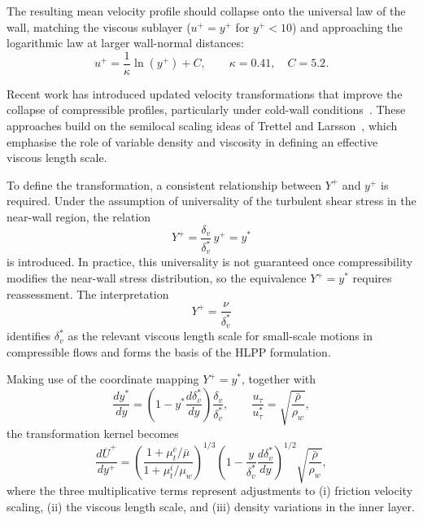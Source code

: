 The resulting mean velocity profile should collapse onto the universal law of the wall, matching the viscous sublayer ($u^{+}=y^{+}$ for $y^{+}<10$) and approaching the logarithmic law at larger wall-normal distances:
\begin{equation}
    u^{+} = \frac{1}{\kappa}\ln(y^{+}) + C, 
    \qquad \kappa = 0.41, \quad C = 5.2 .
\end{equation}

Recent work has introduced updated velocity transformations that improve the collapse of compressible profiles, particularly under cold-wall conditions~\cite{HasanEtal2023}. These approaches build on the semilocal scaling ideas of Trettel and Larsson~\cite{TrettelLarsson2016}, which emphasise the role of variable density and viscosity in defining an effective viscous length scale.

To define the transformation, a consistent relationship between $Y^{+}$ and $y^{+}$ is required. Under the assumption of universality of the turbulent shear stress in the near-wall region, the relation
\begin{equation}
    Y^{+} = \frac{\delta_{v}}{\delta^{*}_{v}}\, y^{+} = y^{*}
\end{equation}
is introduced. In practice, this universality is not guaranteed once compressibility modifies the near-wall stress distribution, so the equivalence $Y^{+}=y^{*}$ requires reassessment. The interpretation
\begin{equation}
    Y^{+} = \frac{\nu}{\delta^{*}_{v}}
\end{equation}
identifies $\delta^{*}_{v}$ as the relevant viscous length scale for small-scale motions in compressible flows and forms the basis of the HLPP formulation.

Making use of the coordinate mapping $Y^{+}=y^{*}$, together with
\begin{equation}
    \frac{dy^{*}}{dy} = \left(1-y^{*}\frac{d\delta^{*}_{v}}{dy}\right)\frac{\delta_{v}}{\delta^{*}_{v}},
    \qquad
    \frac{u_{\tau}}{u^{*}_{\tau}}=\sqrt{\frac{\bar{\rho}}{\rho_{w}}},
\end{equation}
the transformation kernel becomes
\begin{equation}
\frac{d\overline{U}^{+}}{dy^{+}} = 
\left(\frac{1+\mu^{c}_{t}/\bar{\mu}}{1+\mu^{i}_{t}/\mu_{w}}\right)^{1/3}
\left(1-\frac{y}{\delta^{*}_{v}}\frac{d\delta^{*}_{v}}{dy}\right)^{1/2}
\sqrt{\frac{\bar{\rho}}{\rho_{w}}},
\label{eq:TLkernel}
\end{equation}
where the three multiplicative terms represent adjustments to (i) friction velocity scaling, (ii) the viscous length scale, and (iii) density variations in the inner layer.

